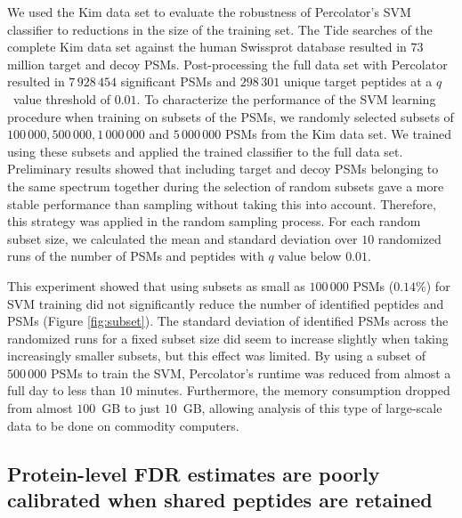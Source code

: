\documentclass{article}
\begin{document}
We used the Kim data set to evaluate the robustness of Percolator's
SVM classifier to reductions in the size of the training set.  The
Tide searches of the complete Kim data set against the human Swissprot
database resulted in $73$ million target and decoy PSMs.
Post-processing the full data set with Percolator resulted in
$7\,928\,454$ significant PSMs and $298\,301$ unique target peptides
at a $q$~value threshold of $0.01$.  To characterize the performance
of the SVM learning procedure when training on subsets of the PSMs, we
randomly selected subsets of $100\,000, 500\,000, 1\,000\,000$ and
$5\,000\,000$ PSMs from the Kim data set.  We trained using these subsets
and applied the trained classifier to the full data set. Preliminary
results showed that including target and decoy PSMs belonging to the
same spectrum together during the selection of random subsets gave a
more stable performance than sampling without taking this into
account. Therefore, this strategy was applied in the random sampling
process. For each random subset size, we calculated the mean and
standard deviation over $10$ randomized runs of the number of PSMs and
peptides with $q$ value below $0.01$.

This experiment showed that using subsets as small as $100\,000$ PSMs
($0.14\%$) for SVM training did not significantly reduce the number of
identified peptides and PSMs (Figure \ref{fig:subset}). The standard
deviation of identified PSMs across the randomized runs for a fixed
subset size did seem to increase slightly when taking increasingly
smaller subsets, but this effect was limited. By using a subset of
$500\,000$ PSMs to train the SVM, Percolator's runtime was reduced
from almost a full day to less than $10$ minutes. Furthermore, the
memory consumption dropped from almost $100$~GB to just $10$~GB,
allowing analysis of this type of large-scale data to be done on
commodity computers.

\subsection*{Protein-level FDR estimates are poorly calibrated when
  shared peptides are retained}
\end{document}
